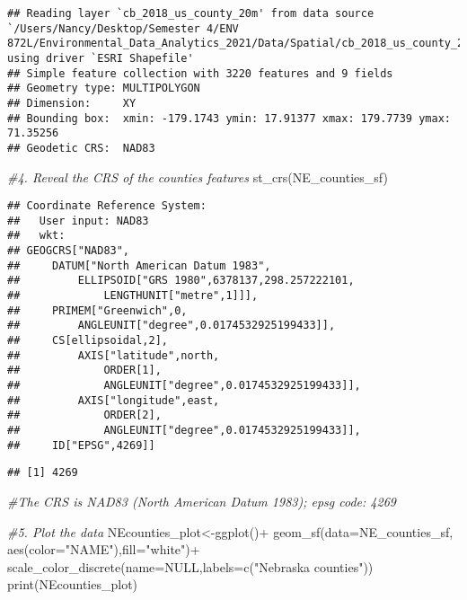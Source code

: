 \documentclass[
]{article}
\newenvironment{Shaded}{\begin{snugshade}}{\end{snugshade}}
\newcommand{\AttributeTok}[1]{\textcolor[rgb]{0.77,0.63,0.00}{#1}}
\newcommand{\CommentTok}[1]{\textcolor[rgb]{0.56,0.35,0.01}{\textit{#1}}}
\newcommand{\ConstantTok}[1]{\textcolor[rgb]{0.00,0.00,0.00}{#1}}
\newcommand{\FunctionTok}[1]{\textcolor[rgb]{0.00,0.00,0.00}{#1}}
\newcommand{\NormalTok}[1]{#1}
\newcommand{\OtherTok}[1]{\textcolor[rgb]{0.56,0.35,0.01}{#1}}
\newcommand{\SpecialCharTok}[1]{\textcolor[rgb]{0.00,0.00,0.00}{#1}}
\newcommand{\StringTok}[1]{\textcolor[rgb]{0.31,0.60,0.02}{#1}}
\begin{document}
\begin{verbatim}
## Reading layer `cb_2018_us_county_20m' from data source `/Users/Nancy/Desktop/Semester 4/ENV 872L/Environmental_Data_Analytics_2021/Data/Spatial/cb_2018_us_county_20m.shp' using driver `ESRI Shapefile'
## Simple feature collection with 3220 features and 9 fields
## Geometry type: MULTIPOLYGON
## Dimension:     XY
## Bounding box:  xmin: -179.1743 ymin: 17.91377 xmax: 179.7739 ymax: 71.35256
## Geodetic CRS:  NAD83
\end{verbatim}

\begin{Shaded}
\begin{Highlighting}[]
\CommentTok{\#4. Reveal the CRS of the counties features}
\FunctionTok{st\_crs}\NormalTok{(NE\_counties\_sf)}
\end{Highlighting}
\end{Shaded}

\begin{verbatim}
## Coordinate Reference System:
##   User input: NAD83 
##   wkt:
## GEOGCRS["NAD83",
##     DATUM["North American Datum 1983",
##         ELLIPSOID["GRS 1980",6378137,298.257222101,
##             LENGTHUNIT["metre",1]]],
##     PRIMEM["Greenwich",0,
##         ANGLEUNIT["degree",0.0174532925199433]],
##     CS[ellipsoidal,2],
##         AXIS["latitude",north,
##             ORDER[1],
##             ANGLEUNIT["degree",0.0174532925199433]],
##         AXIS["longitude",east,
##             ORDER[2],
##             ANGLEUNIT["degree",0.0174532925199433]],
##     ID["EPSG",4269]]
\end{verbatim}

\begin{Shaded}
\end{Shaded}

\begin{verbatim}
## [1] 4269
\end{verbatim}

\begin{Shaded}
\begin{Highlighting}[]
\CommentTok{\#The CRS is NAD83 (North American Datum 1983); epsg code: 4269}

\CommentTok{\#5. Plot the data}
\NormalTok{NEcounties\_plot}\OtherTok{\textless{}{-}}\FunctionTok{ggplot}\NormalTok{()}\SpecialCharTok{+}
                \FunctionTok{geom\_sf}\NormalTok{(}\AttributeTok{data=}\NormalTok{NE\_counties\_sf, }\FunctionTok{aes}\NormalTok{(}\AttributeTok{color=}\StringTok{"NAME"}\NormalTok{),}\AttributeTok{fill=}\StringTok{"white"}\NormalTok{)}\SpecialCharTok{+}
                \FunctionTok{scale\_color\_discrete}\NormalTok{(}\AttributeTok{name=}\ConstantTok{NULL}\NormalTok{,}\AttributeTok{labels=}\FunctionTok{c}\NormalTok{(}\StringTok{"Nebraska counties"}\NormalTok{))}
\FunctionTok{print}\NormalTok{(NEcounties\_plot)}
\end{Highlighting}
\end{Shaded}
\end{document}
